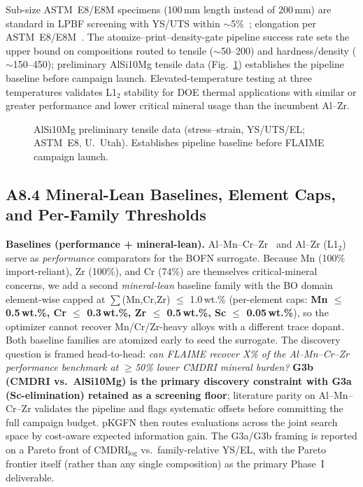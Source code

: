 \documentclass[11pt,letterpaper]{article}
\begin{document}
Sub-size ASTM~E8/E8M specimens (100\,mm length instead of 200\,mm) are
standard in LPBF screening with YS/UTS within
$\sim$5\%~\cite{paraschiv_2023_ma16144930,wang_2020_17452759};
elongation per ASTM~E8/E8M~\cite{astm_2024_e8e8m}.  The
atomize--print--density-gate pipeline success rate sets the upper bound
on compositions routed to tensile ($\sim$50--200) and
hardness/density ($\sim$150--450); preliminary AlSi10Mg tensile data
(Fig.~\ref{fig:tensile}) establishes the pipeline baseline before
campaign launch.  Elevated-temperature testing at three temperatures
validates L1$_{2}$ stability for DOE thermal applications with similar
or greater performance and lower critical mineral usage than the
incumbent Al--Zr.

\begin{figure}[!tb]
  \centering
  \caption{AlSi10Mg preliminary tensile data (stress--strain, YS/UTS/EL; ASTM~E8, U.~Utah). Establishes pipeline baseline before FLAIME campaign launch.}
  \label{fig:tensile}
\end{figure}

\subsection*{A8.4 Mineral-Lean Baselines, Element Caps, and Per-Family Thresholds}
\label{app:a84-mineral-lean}

\textbf{Baselines (performance + mineral-lean).}
Al--Mn--Cr--Zr~\cite{thapliyal_2020_jmtla201} and Al--Zr (L1$_2$) serve as
\emph{performance} comparators for the BOFN surrogate. Because
Mn (100\% import-reliant), Zr (100\%), and Cr (74\%) are themselves
critical-mineral concerns, we add a second \emph{mineral-lean}
baseline family with the BO domain element-wise capped at
$\sum$(Mn,Cr,Zr) $\leq$ 1.0\,wt.\% (per-element caps:
\textbf{Mn $\leq$ 0.5\,wt.\%, Cr $\leq$ 0.3\,wt.\%, Zr $\leq$ 0.5\,wt.\%, Sc $\leq$ 0.05\,wt.\%}),
so the optimizer cannot recover Mn/Cr/Zr-heavy alloys with a different
trace dopant. Both baseline families are atomized early to seed the
surrogate. The discovery question is framed head-to-head: \emph{can
FLAIME recover X\% of the Al--Mn--Cr--Zr performance benchmark at
$\geq$50\% lower CMDRI mineral burden?} \textbf{G3b (CMDRI vs.\ AlSi10Mg)
is the primary discovery constraint with G3a (Sc-elimination)
retained as a screening floor}; literature parity on Al--Mn--Cr--Zr
validates the pipeline and flags systematic offsets before committing
the full campaign budget. pKGFN then routes evaluations across the
joint search space by cost-aware expected information gain. The G3a/G3b
framing is reported on a Pareto front of $\mathrm{CMDRI}_\text{log}$
vs.\ family-relative YS/EL, with the Pareto frontier itself (rather
than any single composition) as the primary Phase~I deliverable.
\end{document}
